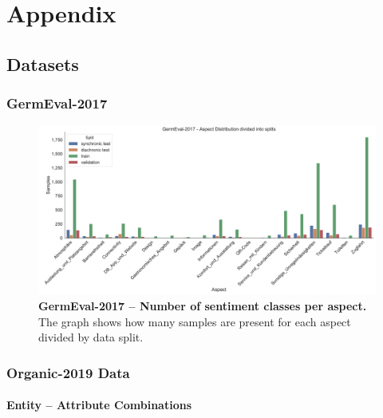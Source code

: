 \chapter{Appendix}

\section{Datasets}

\subsection{GermEval-2017}
\begin{figure}[H]
	\centering
	\includegraphics[width=\textwidth]{figures/08_appendix/08_germevalAspects}
	\caption{\textbf{GermEval-2017 -- Number of sentiment classes per aspect.} The graph shows how many samples are present for each aspect divided by data split.}
	\label{fig:08_germEvalStatistics}
\end{figure}

\subsection{Organic-2019 Data}

\subsubsection*{Entity -- Attribute Combinations}

